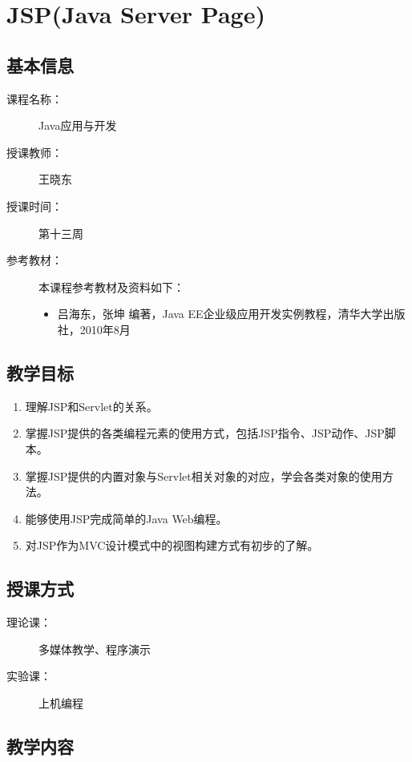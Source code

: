 \chapter{JSP(Java Server Page)}
\label{chp:JavaEE-HTTP-session}

\section*{基本信息}
\sline
\begin{description}
\item[课程名称：] Java应用与开发
\item[授课教师：] 王晓东
\item[授课时间：] 第十三周
\item[参考教材：] 本课程参考教材及资料如下：
  \begin{itemize}
  \item 吕海东，张坤 编著，Java EE企业级应用开发实例教程，清华大学出版社，2010年8月
  \end{itemize}
\end{description}

\section*{教学目标}

\sline

\begin{enumerate}
\item 理解JSP和Servlet的关系。
\item 掌握JSP提供的各类编程元素的使用方式，包括JSP指令、JSP动作、JSP脚本。
\item 掌握JSP提供的内置对象与Servlet相关对象的对应，学会各类对象的使用方法。
\item 能够使用JSP完成简单的Java Web编程。
\item 对JSP作为MVC设计模式中的视图构建方式有初步的了解。  
\end{enumerate}  


\section*{授课方式}

\sline
\begin{description}
\item[理论课：] 多媒体教学、程序演示
\item[实验课：] 上机编程
\end{description}

\newpage
\section*{教学内容}
\sline


